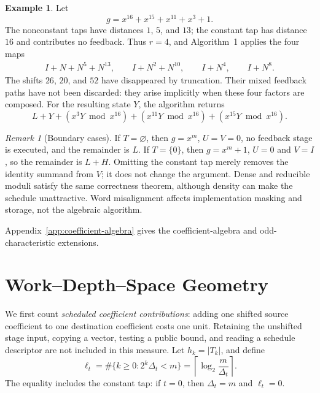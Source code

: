 \documentclass{mcom-l}
\numberwithin{equation}{section}
\theoremstyle{definition}
\newtheorem{example}[theorem]{Example}
\theoremstyle{remark}
\newtheorem{remark}[theorem]{Remark}
\begin{document}
\begin{example}
Let
\[
  g=x^{16}+x^{15}+x^{11}+x^3+1.
\]
The nonconstant taps have distances $1$, $5$, and $13$; the constant tap has
distance $16$ and contributes no feedback.  Thus $r=4$, and Algorithm~1
applies the four maps
\begin{align*}
  I+N+N^5+N^{13},\qquad
  I+N^2+N^{10},\qquad
  I+N^4,\qquad
  I+N^8.
\end{align*}
The shifts $26$, $20$, and $52$ have disappeared by truncation.  Their mixed
feedback paths have not been discarded: they arise implicitly when these
four factors are composed.  For the resulting state $Y$, the algorithm
returns
\[
  L+Y+(x^3Y\bmod x^{16})+(x^{11}Y\bmod x^{16})
    +(x^{15}Y\bmod x^{16}).
\]
\end{example}

\begin{remark}[Boundary cases]
If $T=\varnothing$, then $g=x^m$, $U=V=0$, no feedback stage is executed,
and the remainder is $L$.  If $T=\{0\}$, then $g=x^m+1$, $U=0$ and $V=I$,
so the remainder is $L+H$.  Omitting the constant tap merely removes the
identity summand from $V$; it does not change the argument.  Dense and
reducible moduli satisfy the same correctness theorem, although density can
make the schedule unattractive.  Word misalignment affects implementation
masking and storage, not the algebraic algorithm.
\end{remark}

Appendix~\ref{app:coefficient-algebra} gives the coefficient-algebra and
odd-characteristic extensions.

\section{Work--Depth--Space Geometry}
\label{sec:complexity}

We first count \emph{scheduled coefficient contributions}: adding one shifted
source coefficient to one destination coefficient costs one unit.  Retaining
the unshifted stage input, copying a vector, testing a public bound, and
reading a schedule descriptor are not included in this measure.  Let
$h_k=|T_k|$, and define
\begin{equation}
  \ell_t=\#\{k\ge0:2^k\Delta_t<m\}
  =\left\lceil\log_2\frac{m}{\Delta_t}\right\rceil .
  \label{eq:tap-lifetime}
\end{equation}
The equality includes the constant tap: if $t=0$, then $\Delta_t=m$ and
$\ell_t=0$.
\end{document}
